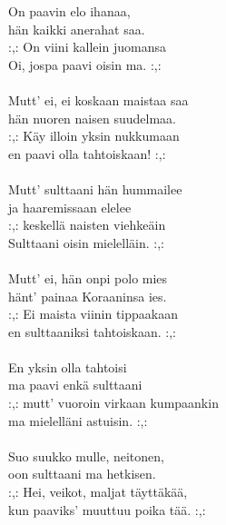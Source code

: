 
On paavin elo ihanaa, \\ hän kaikki anerahat saa. \\ :,: On viini kallein juomansa \\ Oi, jospa paavi oisin ma. :,: \\ \hspace{10mm} \\ Mutt' ei, ei koskaan maistaa saa \\ hän nuoren naisen suudelmaa. \\ :,: Käy illoin yksin nukkumaan \\ en paavi olla tahtoiskaan! :,: \\ \hspace{10mm} \\ Mutt' sulttaani hän hummailee \\ ja haaremissaan elelee \\ :,: keskellä naisten viehkeäin \\ Sulttaani oisin mielelläin. :,: \\ \hspace{10mm} \\ Mutt' ei, hän onpi polo mies \\ hänt' painaa Koraaninsa ies. \\ :,: Ei maista viinin tippaakaan \\ en sulttaaniksi tahtoiskaan. :,: \\ \hspace{10mm} \\ En yksin olla tahtoisi \\ ma paavi enkä sulttaani \\ :,: mutt' vuoroin virkaan kumpaankin \\ ma mielelläni astuisin. :,: \\ \hspace{10mm} \\ Suo suukko mulle, neitonen, \\ oon sulttaani ma hetkisen. \\ :,: Hei, veikot, maljat täyttäkää, \\ kun paaviks' muuttuu poika tää. :,: